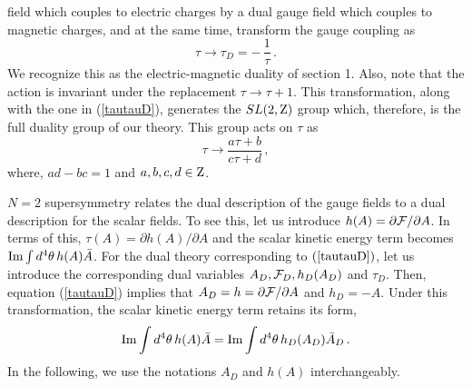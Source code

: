 field which couples to electric charges by a dual gauge field which
couples to magnetic charges, and at the same time, transform the
gauge coupling as  
\begin{equation}
\tau\rightarrow\tau_D = -\,\frac{1}{\tau}\,.
\label{tautauD}
\end{equation}
We recognize this as the electric-magnetic duality of section 1.
Also, note that the action is invariant under the replacement
$\tau\rightarrow\tau+1$. This transformation, along with the one in
(\ref{tautauD}), generates the $SL(2,{\rm Z})$ group which, therefore,
is the full duality group of our theory. This group acts on $\tau$ as 
\begin{equation}
\tau\rightarrow{\frac{a\tau + b}{c\tau + d}}\,,
\label{tauSLtwoZ}
\end{equation}
where, $ad-bc=1$ and $a,b,c,d \in {\rm Z}$. 

$N=2$ supersymmetry relates the dual description of the gauge fields
to a dual description for the scalar fields. To see this, let us
introduce $h(A)=\partial{\cal F}/\partial A$. In terms of this,
$\tau(A)=\partial h(A)/\partial A$ and the scalar kinetic energy term
becomes ${\rm Im}\int d^4\theta\,h(A)\bar A$. For the dual theory
corresponding to $(\ref{tautauD})$, let us introduce the corresponding
dual variables $A_D,{\cal F}_D,h_D(A_D)$ and $\tau_D$. Then, equation
(\ref{tautauD}) implies that $A_D=h=\partial{\cal F}/\partial A$ and 
$h_D = -A$. Under this transformation, the scalar kinetic energy term
retains its form,
$$
{\rm Im}\int d^4\theta\,h(A)\bar A=
{\rm Im}\int d^4\theta\,h_D(A_D)\bar A_D\,. 
$$
In the following, we use the notations $A_D$ and $h(A)$
interchangeably. 

